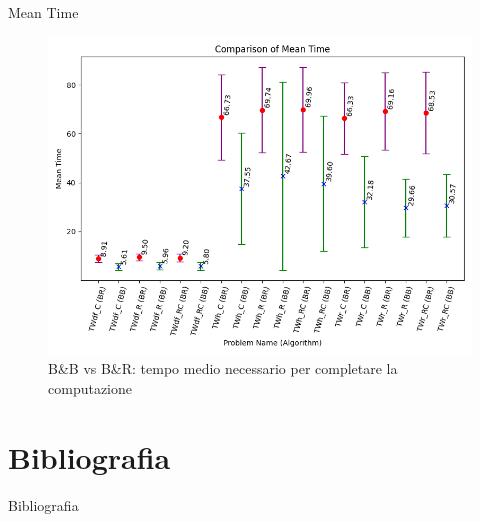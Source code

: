 \documentclass[10pt]{beamer}
\begin{document}
    \begin{frame}{Mean Time}
        \begin{figure}[h!]
            \centering
            \includegraphics[width=1.0\textwidth]{Images/mean_time.png}
            \caption{B\&B vs B\&R: tempo medio necessario per completare la computazione}
            \label{fig:mean_time}
        \end{figure}
    \end{frame}
    
    \section*{Bibliografia}
    \begin{frame}{Bibliografia}
        \printbibliography[heading=none]
    \end{frame}
    
\end{document}
